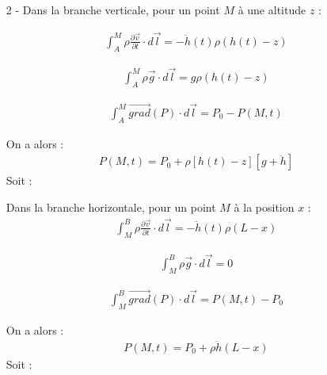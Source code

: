 \documentclass{report}
\begin{document}
\begin{itemize}
\item[2 - ] Dans la branche verticale, pour un point $M$ à une altitude $z$ :

\begin{align*}
	\int_A^M\rho\frac{\partial \vec{v}}{\partial t}\cdot d\vec{l}=-\ddot{h}(t)\rho(h(t)-z)
\end{align*}

\begin{align*}
	\int_A^M\rho\vec{g}\cdot d\vec{l}=g\rho(h(t)-z)
\end{align*}

\begin{align*}
	\int_A^M\vec{grad}(P)\cdot d\vec{l}=P_0-P(M,t)
\end{align*}

On a alors :
\begin{align*}
	P(M,t)=P_0+\rho\left[ h(t)-z \right] \left[g+\ddot{h} \right] 
\end{align*}
Soit :

\noindent{}

Dans la branche horizontale, pour un point $M$ à la position $x$ :
\begin{align*}
	\int_M^B\rho\frac{\partial \vec{v}}{\partial t}\cdot d\vec{l}=-\ddot{h}(t)\rho(L-x)
\end{align*}

\begin{align*}
	\int_M^B\rho\vec{g}\cdot d\vec{l}=0
\end{align*}

\begin{align*}
	\int_M^B\vec{grad}(P)\cdot d\vec{l}=P(M,t)-P_0
\end{align*}

On a alors :
\begin{align*}
	P(M,t)=P_0+\rho\ddot{h}(L-x)
\end{align*}
Soit :

\noindent{}

\end{itemize}
\end{document}
